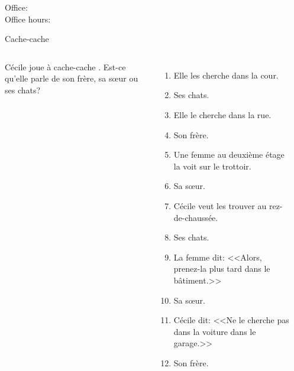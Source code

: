 \documentclass{beamer}
\subtitle[Étages et objets directs]{Les étages et les pronoms compléments d'objet direct}
\begin{document}
  \begin{frame}
    \titlepage
    \tiny{Office: \\
          Office hours: }
  \end{frame}

  \begin{frame}{Cache-cache}
    \begin{columns}
        \scriptsize
        Cécile joue à cache-cache .
        Est-ce qu'elle parle de son frère, sa sœur ou ses chats?
        \begin{enumerate}
          \item Elle les cherche dans la cour.
          \item<2->[$\to$] Ses chats.
          \item<3-> Elle le cherche dans la rue.
          \item<4->[$\to$] Son frère.
          \item<5-> Une femme au deuxième étage la voit sur le trottoir.
          \item<6->[$\to$] Sa sœur.
          \item<7-> Cécile veut les trouver au rez-de-chaussée.
          \item<8->[$\to$] Ses chats.
          \item<9-> La femme dit: <<Alors, prenez-la plus tard dans le bâtiment.>>
          \item<10->[$\to$] Sa sœur.
          \item<11-> Cécile dit: <<Ne le cherche pas dans la voiture dans le garage.>>
          \item<12->[$\to$] Son frère.
        \end{enumerate}
        \begin{minipage}[t][0.6\textheight]{\linewidth}
          \begin{center}
          \end{center}
        \end{minipage}
    \end{columns}
  \end{frame}
\end{document}
